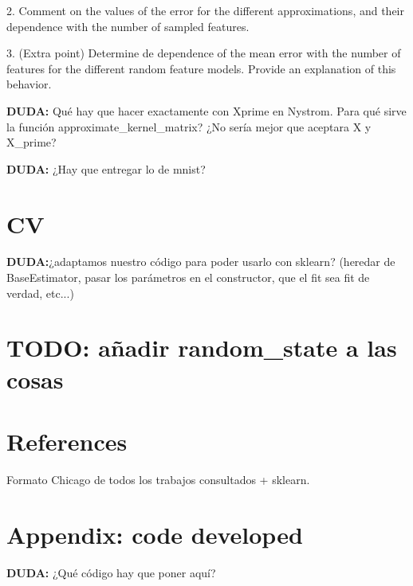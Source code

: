 \documentclass[11pt]{article}
\begin{document}
2. Comment on the values of the error for the different approximations, and their dependence with the number of sampled features.

3. (Extra point) Determine de dependence of the mean error with the number of features for the different random feature models. Provide an explanation of this behavior.

\textbf{DUDA:} Qué hay que hacer exactamente con Xprime en Nystrom. Para qué sirve la función approximate\_kernel\_matrix? ¿No sería mejor que aceptara X y X\_prime?

\textbf{DUDA:} ¿Hay que entregar lo de mnist?

\section{CV}

\textbf{DUDA:}¿adaptamos nuestro código para poder usarlo con sklearn? (heredar de BaseEstimator, pasar los parámetros en el constructor, que el fit sea fit de verdad, etc...)

\section{TODO: añadir random_state a las cosas}


\section*{References}

Formato Chicago de todos los trabajos consultados + sklearn.

\section*{Appendix: code developed}

\textbf{DUDA:} ¿Qué código hay que poner aquí?
\end{document}
